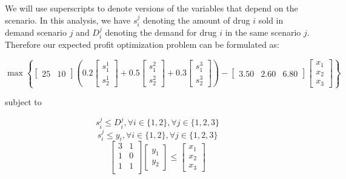 \documentclass[a4paper]{article}
\begin{document}
We will use superscripts to denote versions of the variables that depend on the scenario.
In this analysis, we have $s_i^j$ denoting the amount of drug $i$ sold in demand scenario $j$ and $D_i^j$ denoting the demand for drug $i$ in the same scenario $j$.
Therefore our expected profit optimization problem can be formulated as:

\begin{equation}
\max \left \{ [\begin{matrix}25 & 10\end{matrix}]
\left( 0.2 \left [\begin{matrix}s_1^1 \\ s_2^1 \end{matrix} \right ] + 0.5 \left [\begin{matrix}s_1^2 \\ s_2^2 \end{matrix} \right ] + 0.3 \left [\begin{matrix}s_1^3 \\ s_2^3 \end{matrix} \right ] \right)
-[\begin{matrix}3.50 & 2.60 & 6.80\end{matrix}] \left [\begin{matrix}x_1 \\ x_2 \\ x_3 \end{matrix} \right ]
\right \}
\end{equation}

subject to

\begin{equation}
s_i^j \leq D_i^j , \forall i \in \{1,2\} , \forall j \in \{1,2,3\}
\end{equation}
\begin{equation}
s_i^j \leq y_i , \forall i \in \{1,2\} , \forall j \in \{1,2,3\}
\end{equation}
\begin{equation}
\left[
\begin{matrix}
3 & 1 \\
1 & 0 \\
1 & 1 \\
\end{matrix}
\right]
\left[\begin{matrix}y_1 \\ y_2\end{matrix}\right]
\leq
\left[\begin{matrix}x_1 \\ x_2 \\ x_3 \end{matrix}\right]
\end{equation}
\end{document}
